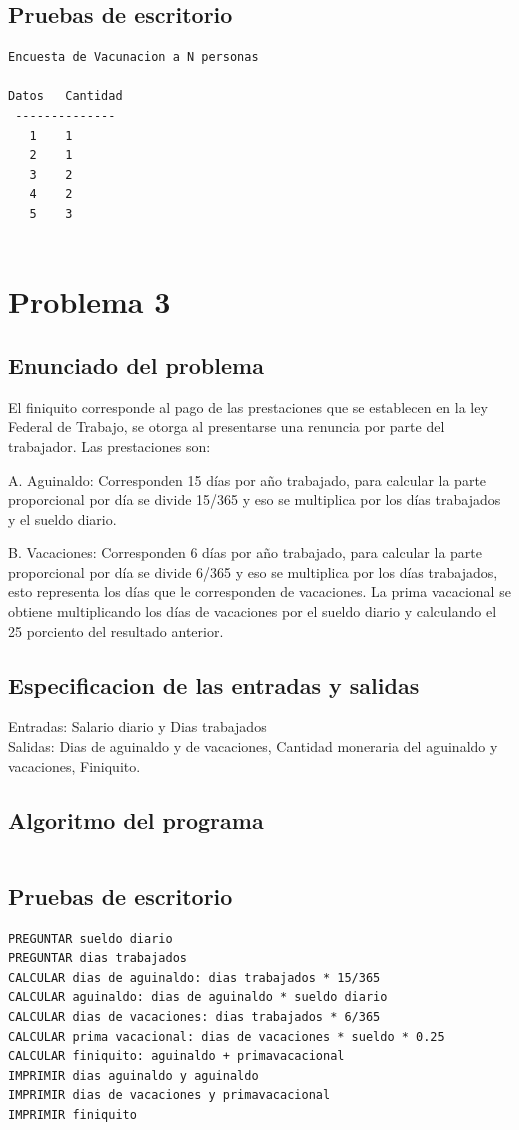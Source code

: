 \documentclass[12pt]{article}
\begin{document}
\subsection{Pruebas de escritorio }
\begin{verbatim}
Encuesta de Vacunacion a N personas

Datos   Cantidad
 --------------
   1    1
   2    1
   3    2
   4    2
   5    3
 
\end{verbatim}
\section{Problema 3}

\subsection{Enunciado del problema}
El finiquito corresponde al pago de las prestaciones que se establecen en la ley Federal de Trabajo, se otorga al presentarse una renuncia por parte del trabajador. Las prestaciones son: 

A. Aguinaldo: Corresponden 15 d\'{i}as por a\~{n}o trabajado, para calcular la parte proporcional por d\'{i}a se divide 15/365 y eso se multiplica por los d\'{i}as trabajados y el sueldo diario.

B. Vacaciones: Corresponden 6 d\'{i}as por a\~{n}o trabajado, para calcular la parte proporcional por d\'{i}a se divide 6/365 y eso se multiplica por los d\'{i}as trabajados, esto representa los d\'{i}as que le corresponden de vacaciones. La prima vacacional se obtiene multiplicando los d\'{i}as de vacaciones por el sueldo diario y calculando el 25 porciento del resultado anterior.
\subsection{Especificacion de las entradas y salidas}
Entradas: Salario diario y Dias trabajados\\ 
Salidas: Dias de aguinaldo y de vacaciones, Cantidad moneraria del aguinaldo y vacaciones, Finiquito.
\subsection{Algoritmo del programa}
\begin{verbatim}

\end{verbatim}
\subsection{Pruebas de escritorio}
\begin{verbatim}
PREGUNTAR sueldo diario
PREGUNTAR dias trabajados
CALCULAR dias de aguinaldo: dias trabajados * 15/365
CALCULAR aguinaldo: dias de aguinaldo * sueldo diario
CALCULAR dias de vacaciones: dias trabajados * 6/365
CALCULAR prima vacacional: dias de vacaciones * sueldo * 0.25
CALCULAR finiquito: aguinaldo + primavacacional
IMPRIMIR dias aguinaldo y aguinaldo
IMPRIMIR dias de vacaciones y primavacacional
IMPRIMIR finiquito
\end{verbatim}
\end{document}
